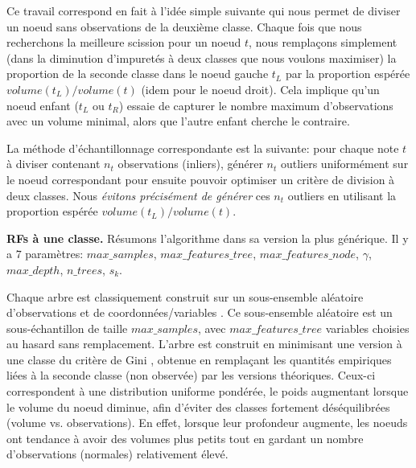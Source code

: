 \begin{remarque}
Ce travail correspond en fait à l'idée simple suivante qui nous permet de diviser un noeud sans observations de la deuxième classe.
Chaque fois que nous recherchons la meilleure scission pour un noeud $t$, nous remplaçons simplement (dans la diminution d'impuretés à deux classes que nous voulons maximiser) la proportion de la seconde classe dans le noeud gauche $t_L$ par la proportion espérée $volume(t_L)/volume(t)$ (idem pour le noeud droit).
Cela implique qu'un noeud enfant ($t_L$ ou $t_R$) essaie de capturer le nombre maximum d'observations avec un volume minimal, alors que l'autre enfant cherche le contraire.
\end{remarque}


\begin{remarque}
La méthode d'échantillonnage correspondante est la suivante: pour chaque note $t$ à diviser contenant $n_t$ observations (inliers), générer $n_t$ outliers uniformément sur le noeud  correspondant pour ensuite pouvoir optimiser un critère de division à deux classes. Nous \emph {évitons précisément de générer} ces $n_t$ outliers en utilisant la proportion espérée $volume(t_L) / volume(t)$.
\end{remarque}



\textbf{RFs à une classe.} Résumons l'algorithme dans sa version la plus générique.
Il y a $7$ paramètres:
%
$max\_samples$, $max\_features\_tree$, $max\_features\_node$, $\gamma$, $max\_depth$, $n\_trees$, $s_k$.
%

Chaque arbre est classiquement construit sur un sous-ensemble aléatoire d'observations et de coordonnées/variables  \citep{Ho1998, Panov2007}.
Ce sous-ensemble aléatoire est un sous-échantillon de taille $max\_samples$, avec $max\_features\_tree$ variables choisies au hasard sans remplacement. %
L'arbre est construit en minimisant une version à une classe du critère de Gini \citep{Gini1912}, obtenue en remplaçant les quantités empiriques liées à la seconde classe (non observée) par les versions théoriques. Ceux-ci correspondent à une distribution uniforme pondérée, le poids augmentant lorsque le volume du noeud diminue, afin d'éviter des classes fortement déséquilibrées (volume vs. observations). En effet, lorsque leur profondeur augmente, les noeuds ont tendance à avoir des volumes plus petits tout en gardant un nombre d'observations (normales) relativement élevé.

